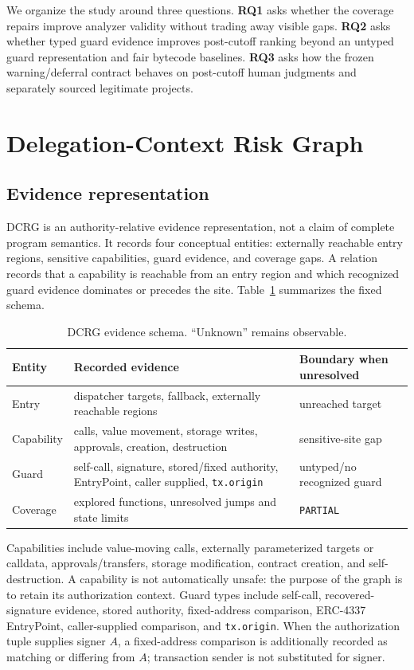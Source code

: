 \documentclass[conference]{IEEEtran}
\newcommand{\code}[1]{\texttt{#1}}
\begin{document}
We organize the study around three questions. \textbf{RQ1} asks whether the coverage repairs improve
analyzer validity without trading away visible gaps. \textbf{RQ2} asks whether typed guard evidence
improves post-cutoff ranking beyond an untyped guard representation and fair bytecode baselines.
\textbf{RQ3} asks how the frozen warning/deferral contract behaves on post-cutoff human judgments
and separately sourced legitimate projects.

\section{Delegation-Context Risk Graph}

\subsection{Evidence representation}

DCRG is an authority-relative evidence representation, not a claim of complete program semantics.
It records four conceptual entities: externally reachable entry regions, sensitive capabilities,
guard evidence, and coverage gaps. A relation records that a capability is reachable from an entry
region and which recognized guard evidence dominates or precedes the site. Table~\ref{tab:schema}
summarizes the fixed schema.

\begin{table}[t]
\centering
\caption{DCRG evidence schema. ``Unknown'' remains observable.}
\label{tab:schema}
\small
\begin{tabularx}{\columnwidth}{p{}XX}
\toprule
Entity & Recorded evidence & Boundary when unresolved \\
\midrule
Entry & dispatcher targets, fallback, externally reachable regions & unreached target \\
Capability & calls, value movement, storage writes, approvals, creation, destruction & sensitive-site gap \\
Guard & self-call, signature, stored/fixed authority, EntryPoint, caller supplied, \code{tx.origin} & untyped/no recognized guard \\
Coverage & explored functions, unresolved jumps and state limits & \code{PARTIAL} \\
\bottomrule
\end{tabularx}
\end{table}

Capabilities include value-moving calls, externally parameterized targets or calldata,
approvals/transfers, storage modification, contract creation, and self-destruction. A capability is
not automatically unsafe: the purpose of the graph is to retain its authorization context. Guard
types include self-call, recovered-signature evidence, stored authority, fixed-address comparison,
ERC-4337 EntryPoint, caller-supplied comparison, and \code{tx.origin}. When the authorization tuple
supplies signer $A$, a fixed-address comparison is additionally recorded as matching or differing
from $A$; transaction sender is not substituted for signer.
\end{document}
